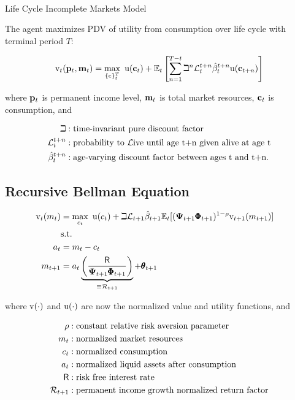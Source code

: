 \documentclass[
  letterpaper,
  DIV=11,
  numbers=noendperiod]{scrartcl}
\makeatletter
\let\oldparagraph\paragraph
\renewcommand{\paragraph}{
    \@ifstar
      \xxxParagraphStar
      \xxxParagraphNoStar
  }
\newcommand{\xxxParagraphStar}[1]{\oldparagraph*{#1}\mbox{}}
\newcommand{\xxxParagraphNoStar}[1]{\oldparagraph{#1}\mbox{}}
\makeatother
\begin{document}
\paragraph{Life Cycle Incomplete Markets
Model}\label{life-cycle-incomplete-markets-model}

The agent maximizes PDV of utility from consumption over life cycle with
terminal period \(T\):

\[\begin{equation}
\label{eq:lifecyclemax}
\mathrm{v}_{t}(\mathbf{p}_{t},\mathbf{m}_{t})  = \max_{\{\mathrm{c}\}_{t}^{T}} ~ \mathrm{u}(\mathbf{c}_{t})+\mathbb{E}_{t}\left[\sum_{n=1}^{T-t} {\beth}^{n} \mathcal{L}_{t}^{t+n}\hat{\beta}_{t}^{t+n} \mathrm{u}(\mathbf{c}_{t+n}) \right]
\end{equation}\]

where \(\mathbf{p}_{t}\) is permanent income level, \(\mathbf{m}_{t}\) is total
market resources, \(\mathbf{c}_{t}\) is consumption, and

\[\begin{aligned}
    \beth & :  \text{time-invariant pure discount factor}
    \\ \mathcal{L} _{t}^{t+n} & :  \text{probability to }\mathcal{L}\text{ive until age t+n given alive at age t}
    \\ \hat{\beta}_{t}^{t+n} & :  \text{age-varying discount factor between ages t and t+n.}
\end{aligned}\]

\subsection{Recursive Bellman
Equation}\label{recursive-bellman-equation}

\[\begin{aligned}
    {\mathrm{v}}_{t}({m}_{t}) & = \max_{c_{t}} ~ \mathrm{u}(c_{t})+\beth\mathcal{L}_{t+1}\hat{\beta}_{t+1}
    \mathbb{E}_{t}[(\mathbf{\Psi}_{t+1}\pmb{\Phi}_{t+1})^{1-\rho}{\mathrm{v}}_{t+1}({m}_{t+1})]
    \\ & \text{s.t.} & 
    \\ a_{t} & = {m}_{t}-c_{t} 
    \\ {m}_{t+1} & = a_{t}\underbrace{\left(\frac{\mathsf{R}}{\mathbf{\Psi}_{t+1}\pmb{\Phi}_{t+1}}\right)}_{\equiv \mathcal{R}_{t+1}} + \pmb{\theta}_{t+1}
\end{aligned}\]

where \(\mathrm{v}(\cdot)\) and \(\mathrm{u}(\cdot)\) are now the normalized
value and utility functions, and

\[\begin{aligned}
  \rho & : \text{constant relative risk aversion parameter} \\
  m_{t} & : \text{normalized market resources} \\
  c_{t} & : \text{normalized consumption} \\
  a_{t} & : \text{normalized liquid assets after consumption} \\
  \mathsf{R} & : \text{risk free interest rate}
    \\ \mathcal{R}_{t+1} & :  \text{permanent income growth normalized return factor}
\end{aligned}\]
\end{document}
